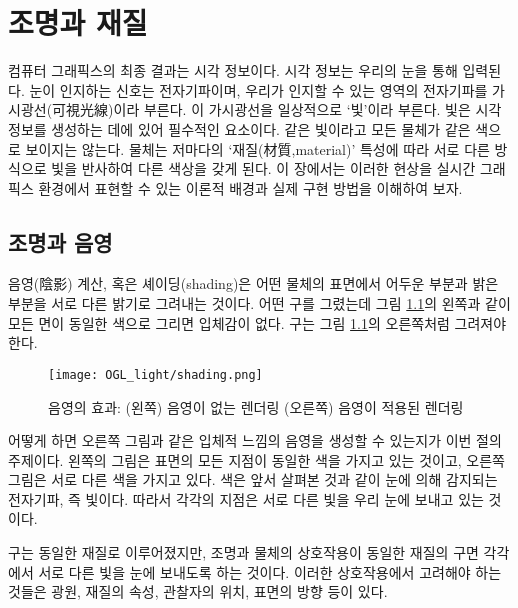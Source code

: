 \renewcommand\chapterillustration{OGL_light/chapterImage}



\chapter{조명과 재질}


컴퓨터 그래픽스의 최종 결과는 시각 정보이다. 시각 정보는 우리의 눈을 통해 입력된다. 
눈이 인지하는 신호는 전자기파이며, 우리가 인지할 수 있는 영역의 전자기파를 가시광선(可視光線)이라 부른다.
이 가시광선을 일상적으로 `빛'이라 부른다. 빛은 시각정보를 생성하는 데에 있어 필수적인 요소이다.
같은 빛이라고 모든 물체가 같은 색으로 보이지는 않는다. 물체는 저마다의 `재질(材質,material)' 특성에 따라
서로 다른 방식으로 빛을 반사하여 다른 색상을 갖게 된다. 이 장에서는 이러한 현상을 실시간 그래픽스
환경에서 표현할 수 있는 이론적 배경과 실제 구현 방법을 이해하여 보자.

\section{조명과 음영}

음영(陰影) 계산, 혹은 셰이딩(shading)은 어떤 물체의 표면에서 어두운 부분과 밝은 부분을 서로 다른 밝기로 그려내는 것이다. 어떤 구를 그렸는데 그림 \ref{fig:OGL_light:shading}의 왼쪽과 같이 모든 면이 동일한 색으로 그리면 입체감이 없다. 구는 그림 \ref{fig:OGL_light:shading}의 오른쪽처럼 그려져야 한다.

\begin{figure}[h!]
  \centering
    \texttt{[image: OGL\_light/shading.png]}
    \caption{음영의 효과: (왼쪽) 음영이 없는 렌더링 (오른쪽) 음영이 적용된 렌더링}
    \label{fig:OGL_light:shading}
\end{figure}

어떻게 하면 오른쪽 그림과 같은 입체적 느낌의 음영을 생성할 수 있는지가 이번 절의 주제이다. 왼쪽의 그림은 표면의 모든 지점이 동일한 색을 가지고 있는 것이고, 오른쪽 그림은 서로 다른 색을 가지고 있다. 색은 앞서 살펴본 것과 같이 눈에 의해 감지되는 전자기파, 즉 빛이다. 따라서 각각의 지점은 서로 다른 빛을 우리 눈에 보내고 있는 것이다.

구는 동일한 재질로 이루어졌지만, 조명과 물체의 상호작용이 동일한 재질의 구면 각각에서 서로 다른 빛을 눈에 보내도록 하는 것이다. 
이러한 상호작용에서 고려해야 하는 것들은 광원, 재질의 속성, 관찰자의 위치, 표면의 방향 등이 있다.

